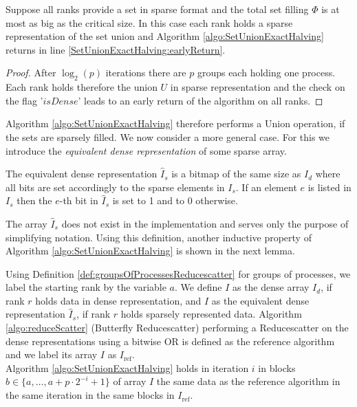 \begin{corollary} \label{cor:UnionButterflyAllgather}
	Suppose all ranks provide a set in sparse format and the total set filling $\Phi$ is at most as big as the critical size. In this case each rank holds a sparse representation of the set union and Algorithm \ref{algo:SetUnionExactHalving} returns in line \ref{SetUnionExactHalving:earlyReturn}.
\end{corollary}
\begin{proof}
	After $\log_2(p)$ iterations there are $p$ groups each holding one process. Each rank holds therefore the union $U$ in sparse representation and the check on the flag '$isDense$' leads to an early return of the algorithm on all ranks. 
\end{proof}
Algorithm \ref{algo:SetUnionExactHalving} therefore performs a Union operation, if the sets are sparsely filled. We now consider a more general case. For this we introduce the \emph{equivalent dense representation} of some sparse array.
\begin{definition}
	The equivalent dense representation $\hat{I}_s$ is a bitmap of the same size as $I_d$ where all bits are set accordingly to the sparse elements in $I_s$. If an element $e$ is listed in $I_s$ then the $e$-th bit in $\hat{I}_s$ is set to 1 and to 0 otherwise.
\end{definition}
The array $\hat{I}_s$ does not exist in the implementation and serves only the purpose of simplifying notation. Using this definition, another inductive property of Algorithm \ref{algo:SetUnionExactHalving} is shown in the next lemma.
\begin{lemma}
	Using Definition \ref{def:groupsOfProcessesReducescatter} for groups of processes, we label the starting rank by the variable $a$. We define $I$ as the dense array $I_d$, if rank $r$ holds data in dense representation, and $I$ as the equivalent dense representation $\hat{I}_s$, if rank $r$ holds sparsely represented data. Algorithm \ref{algo:reduceScatter} (Butterfly Reducescatter) performing a Reducescatter on the dense representations using a bitwise OR is defined as the reference algorithm and we label its array $I$ as $I_{\mathrm{ref}}$.\\
	Algorithm \ref{algo:SetUnionExactHalving} holds in iteration $i$ in blocks $b\in\{a, \dots, a+p\cdot2^{-i}+1\}$ of array $I$ the same data as the reference algorithm in the same iteration in the same blocks in $I_\mathrm{ref}$.
\end{lemma} \label{lemm:unionButterflyInductionDense}
